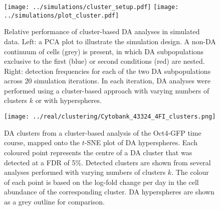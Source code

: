 \documentclass{article}
\begin{document}
\begin{figure}[p]
\begin{center}
\texttt{[image: ../simulations/cluster\_setup.pdf]}
\texttt{[image: ../simulations/plot\_cluster.pdf]}
\end{center}
\caption{Relative performance of cluster-based DA analyses in simulated data.
    Left: a PCA plot to illustrate the simulation design.
    A non-DA continuum of cells (grey) is present, in which DA subpopulations exclusive to the first (blue) or second conditions (red) are nested.
    Right: detection frequencies for each of the two DA subpopulations across 20 simulation iterations.
    In each iteration, DA analyses were performed using a cluster-based approach with varying numbers of clusters $k$ or with hyperspheres.
}
\label{fig:clustersim}
\end{figure}

\begin{figure}[p]
\begin{center}
\texttt{[image: ../real/clustering/Cytobank\_43324\_4FI\_clusters.png]}
\end{center}
\caption{DA clusters from a cluster-based analysis of the Oct4-GFP time course, mapped onto the $t$-SNE plot of DA hyperspheres.
Each coloured point represents the centre of a DA cluster that was detected at a FDR of 5\%.
Detected clusters are shown from several analyses performed with varying numbers of clusters $k$.
The colour of each point is based on the log-fold change per day in the cell abundance of the corresponding cluster.
DA hyperspheres are shown as a grey outline for comparison.
}
\end{figure}
\end{document}
